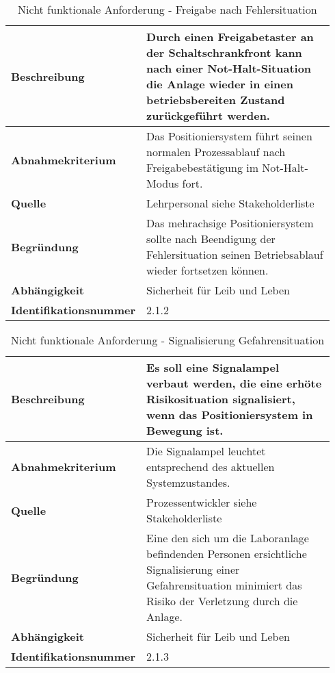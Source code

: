 \documentclass[../../../Bachelorarbeit.tex]{subfiles}
\begin{document}
\begin{table}[H]
    \centering
    \begin{tabular}{| p{0.34\linewidth} | p{0.6\linewidth} |}
        \hline
        \textbf{Beschreibung} & Durch einen Freigabetaster an der Schaltschrankfront kann nach einer Not-Halt-Situation die Anlage wieder in einen betriebsbereiten Zustand zurückgeführt werden. \\ \hline
        \textbf{Abnahmekriterium} & Das Positioniersystem führt seinen normalen Prozessablauf nach Freigabebestätigung im Not-Halt-Modus fort. \\ \hline
        \textbf{Quelle} & Lehrpersonal siehe Stakeholderliste \\ \hline
        \textbf{Begründung} & Das mehrachsige Positioniersystem sollte nach Beendigung der Fehlersituation seinen Betriebsablauf wieder fortsetzen können. \\ \hline
        \textbf{Abhängigkeit} & Sicherheit für Leib und Leben \\ \hline
        \textbf{Identifikationsnummer} & 2.1.2 \\ \hline
    \end{tabular}
    \caption[\acs{nfa} - Freigabe nach Fehlersituation]{Nicht funktionale Anforderung - Freigabe nach Fehlersituation}
    \label{tab:my-table12}
\end{table}

\begin{table}[H]
    \centering
    \begin{tabular}{| p{0.34\linewidth} | p{0.6\linewidth} |}
        \hline
        \textbf{Beschreibung} & Es soll eine Signalampel verbaut werden, die eine erhöte Risikosituation signalisiert, wenn das Positioniersystem in Bewegung ist. \\ \hline
        \textbf{Abnahmekriterium} & Die Signalampel leuchtet entsprechend des aktuellen Systemzustandes. \\ \hline
        \textbf{Quelle} & Prozessentwickler siehe Stakeholderliste \\ \hline
        \textbf{Begründung} & Eine den sich um die Laboranlage befindenden Personen ersichtliche Signalisierung einer Gefahrensituation minimiert das Risiko der Verletzung durch die Anlage. \\ \hline
        \textbf{Abhängigkeit} & Sicherheit für Leib und Leben \\ \hline
        \textbf{Identifikationsnummer} & 2.1.3 \\ \hline
    \end{tabular}
    \caption[\acs{nfa} - Signalisierung Gefahrensituation]{Nicht funktionale Anforderung - Signalisierung Gefahrensituation}
    \label{tab:my-table13}
\end{table}
\end{document}
